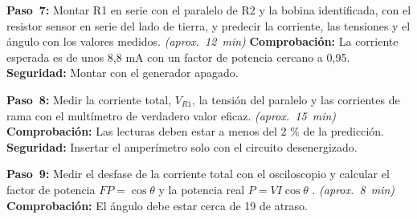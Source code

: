 \documentclass[12pt]{article}
\begin{document}
\begin{pasos}
  \item \textbf{Paso~7:} Montar R1 en serie con el paralelo de R2 y la bobina identificada, con el resistor sensor en serie del lado de tierra, y predecir la corriente, las tensiones y el ángulo con los valores medidos. \emph{(aprox.~\SI{12}{\minute})} \textbf{Comprobación:} La corriente esperada es de unos 8,8 mA con un factor de potencia cercano a 0,95. \textbf{Seguridad:} Montar con el generador apagado.
  \item \textbf{Paso~8:} Medir la corriente total, $V_{R1}$, la tensión del paralelo y las corrientes de rama con el multímetro de verdadero valor eficaz. \emph{(aprox.~\SI{15}{\minute})} \textbf{Comprobación:} Las lecturas deben estar a menos del 2 \% de la predicción. \textbf{Seguridad:} Insertar el amperímetro solo con el circuito desenergizado.
  \item \textbf{Paso~9:} Medir el desfase de la corriente total con el osciloscopio y calcular el factor de potencia $FP = \cos\theta$ y la potencia real $P = V I \cos\theta$ \cite{ref1}. \emph{(aprox.~\SI{8}{\minute})} \textbf{Comprobación:} El ángulo debe estar cerca de 19\textdegree{} de atraso.
\end{pasos}
\end{document}
